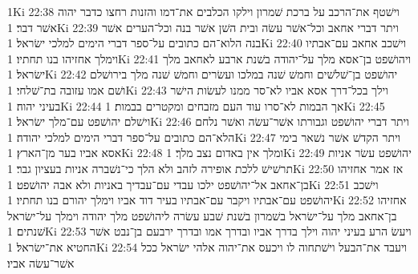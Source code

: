 1Ki 22:38  וישׁטף את־הרכב על ברכת שׁמרון וילקו הכלבים את־דמו והזנות רחצו כדבר יהוה אשׁר דבר׃
1Ki 22:39  ויתר דברי אחאב וכל־אשׁר עשׂה ובית השׁן אשׁר בנה וכל־הערים אשׁר בנה הלוא־הם כתובים על־ספר דברי הימים למלכי ישׂראל׃
1Ki 22:40  וישׁכב אחאב עם־אבתיו וימלך אחזיהו בנו תחתיו׃
1Ki 22:41  ויהושׁפט בן־אסא מלך על־יהודה בשׁנת ארבע לאחאב מלך ישׂראל׃
1Ki 22:42  יהושׁפט בן־שׁלשׁים וחמשׁ שׁנה במלכו ועשׂרים וחמשׁ שׁנה מלך בירושׁלם ושׁם אמו עזובה בת־שׁלחי׃
1Ki 22:43  וילך בכל־דרך אסא אביו לא־סר ממנו לעשׂות הישׁר בעיני יהוה׃
1Ki 22:44  אך הבמות לא־סרו עוד העם מזבחים ומקטרים בבמות׃
1Ki 22:45  וישׁלם יהושׁפט עם־מלך ישׂראל׃
1Ki 22:46  ויתר דברי יהושׁפט וגבורתו אשׁר־עשׂה ואשׁר נלחם הלא־הם כתובים על־ספר דברי הימים למלכי יהודה׃
1Ki 22:47  ויתר הקדשׁ אשׁר נשׁאר בימי אסא אביו בער מן־הארץ׃
1Ki 22:48  ומלך אין באדום נצב מלך׃
1Ki 22:49  יהושׁפט עשׂר אניות תרשׁישׁ ללכת אופירה לזהב ולא הלך כי־נשׁברה אניות בעציון גבר׃
1Ki 22:50  אז אמר אחזיהו בן־אחאב אל־יהושׁפט ילכו עבדי עם־עבדיך באניות ולא אבה יהושׁפט׃
1Ki 22:51  וישׁכב יהושׁפט עם־אבתיו ויקבר עם־אבתיו בעיר דוד אביו וימלך יהורם בנו תחתיו׃
1Ki 22:52  אחזיהו בן־אחאב מלך על־ישׂראל בשׁמרון בשׁנת שׁבע עשׂרה ליהושׁפט מלך יהודה וימלך על־ישׂראל שׁנתים׃
1Ki 22:53  ויעשׂ הרע בעיני יהוה וילך בדרך אביו ובדרך אמו ובדרך ירבעם בן־נבט אשׁר החטיא את־ישׂראל׃
1Ki 22:54  ויעבד את־הבעל וישׁתחוה לו ויכעס את־יהוה אלהי ישׂראל ככל אשׁר־עשׂה אביו׃


